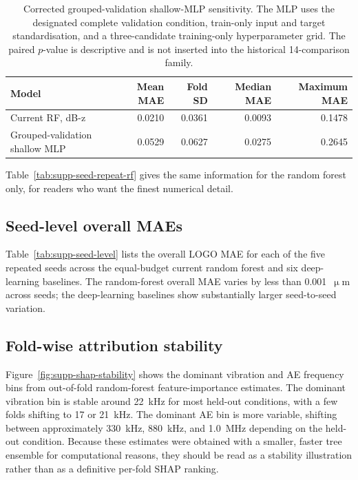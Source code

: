 \begin{table}[htbp]
\centering
\caption{Corrected grouped-validation shallow-MLP sensitivity. The MLP uses
the designated complete validation condition, train-only input and target
standardisation, and a three-candidate training-only hyperparameter grid. The
paired \(p\)-value is descriptive and is not inserted into the historical
14-comparison family.}\label{tab:supp-grouped-mlp}
\begin{tabular}{@{}lrrrr@{}}
\toprule
Model & Mean MAE & Fold SD & Median MAE & Maximum MAE \\
\midrule
Current RF, dB-z & 0.0210 & 0.0361 & 0.0093 & 0.1478 \\
Grouped-validation shallow MLP & 0.0529 & 0.0627 & 0.0275 & 0.2645 \\
\bottomrule
\end{tabular}
\end{table}



Table~\ref{tab:supp-seed-repeat-rf} gives the same information for the
random forest only, for readers who want the finest numerical detail.



\subsection*{Seed-level overall MAEs}

Table~\ref{tab:supp-seed-level} lists the overall LOGO MAE for each of
the five repeated seeds across the equal-budget current random forest and six
deep-learning baselines. The random-forest overall MAE varies by less
than 0.001~\(\upmu\)m across seeds; the deep-learning baselines show
substantially larger seed-to-seed variation.

\begin{table}[htbp]
\centering
\caption{Overall LOGO MAE (\(\upmu\)m) by random seed for the equal-budget
14-condition random forest and six repeated 14-condition deep-learning baselines.}
\label{tab:supp-seed-level}

\end{table}

\subsection*{Fold-wise attribution stability}

Figure~\ref{fig:supp-shap-stability} shows the dominant vibration and AE
frequency bins from out-of-fold random-forest feature-importance
estimates. The dominant vibration bin is stable around 22~kHz for most
held-out conditions, with a few folds shifting to 17 or 21~kHz. The
dominant AE bin is more variable, shifting between approximately
330~kHz, 880~kHz, and 1.0~MHz depending on the held-out condition.
Because these estimates were obtained with a smaller, faster tree
ensemble for computational reasons, they should be read as a stability
illustration rather than as a definitive per-fold SHAP ranking.

